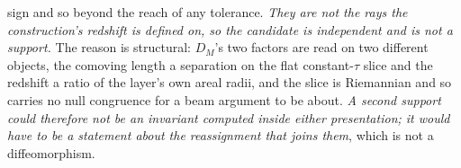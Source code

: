 \documentclass[11pt,a4paper]{article}
\theoremstyle{plain}
\theoremstyle{definition}
\theoremstyle{remark}
\begin{document}
\begin{enumerate}
sign and so beyond the reach of any tolerance. \emph{They are not the rays the construction's redshift is defined on, so the candidate is independent and is not a support.} The reason is structural: $D_M$'s two factors are read on two different objects, the comoving length a separation on the flat constant-$\tau$ slice and the redshift a ratio of the layer's own areal radii, and the slice is Riemannian and so carries no null congruence for a beam argument to be about. \emph{A second support could therefore not be an invariant computed inside either presentation; it would have to be a statement about the reassignment that joins them}, which is not a diffeomorphism.


\end{enumerate}
\end{document}
